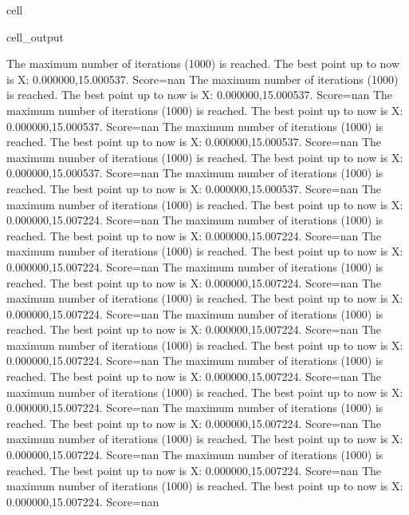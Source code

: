 \documentclass[letterpaper,10pt,english]{jupyterBook}
\begin{document}
\begin{sphinxuseclass}{cell}
\begin{sphinxVerbatimOutput}
\begin{sphinxuseclass}{cell_output}
\begin{sphinxVerbatim}[commandchars=\\\{\}]
The maximum number of iterations (1000) is reached. The best point up to now is X: \PYGZob{}0.000000,15.000537\PYGZcb{}. Score=\PYGZhy{}nan
The maximum number of iterations (1000) is reached. The best point up to now is X: \PYGZob{}0.000000,15.000537\PYGZcb{}. Score=\PYGZhy{}nan
The maximum number of iterations (1000) is reached. The best point up to now is X: \PYGZob{}0.000000,15.000537\PYGZcb{}. Score=\PYGZhy{}nan
The maximum number of iterations (1000) is reached. The best point up to now is X: \PYGZob{}0.000000,15.000537\PYGZcb{}. Score=\PYGZhy{}nan
The maximum number of iterations (1000) is reached. The best point up to now is X: \PYGZob{}0.000000,15.000537\PYGZcb{}. Score=\PYGZhy{}nan
The maximum number of iterations (1000) is reached. The best point up to now is X: \PYGZob{}0.000000,15.000537\PYGZcb{}. Score=\PYGZhy{}nan
The maximum number of iterations (1000) is reached. The best point up to now is X: \PYGZob{}0.000000,15.007224\PYGZcb{}. Score=\PYGZhy{}nan
The maximum number of iterations (1000) is reached. The best point up to now is X: \PYGZob{}0.000000,15.007224\PYGZcb{}. Score=\PYGZhy{}nan
The maximum number of iterations (1000) is reached. The best point up to now is X: \PYGZob{}0.000000,15.007224\PYGZcb{}. Score=\PYGZhy{}nan
The maximum number of iterations (1000) is reached. The best point up to now is X: \PYGZob{}0.000000,15.007224\PYGZcb{}. Score=\PYGZhy{}nan
The maximum number of iterations (1000) is reached. The best point up to now is X: \PYGZob{}0.000000,15.007224\PYGZcb{}. Score=\PYGZhy{}nan
The maximum number of iterations (1000) is reached. The best point up to now is X: \PYGZob{}0.000000,15.007224\PYGZcb{}. Score=\PYGZhy{}nan
The maximum number of iterations (1000) is reached. The best point up to now is X: \PYGZob{}0.000000,15.007224\PYGZcb{}. Score=\PYGZhy{}nan
The maximum number of iterations (1000) is reached. The best point up to now is X: \PYGZob{}0.000000,15.007224\PYGZcb{}. Score=\PYGZhy{}nan
The maximum number of iterations (1000) is reached. The best point up to now is X: \PYGZob{}0.000000,15.007224\PYGZcb{}. Score=\PYGZhy{}nan
The maximum number of iterations (1000) is reached. The best point up to now is X: \PYGZob{}0.000000,15.007224\PYGZcb{}. Score=\PYGZhy{}nan
The maximum number of iterations (1000) is reached. The best point up to now is X: \PYGZob{}0.000000,15.007224\PYGZcb{}. Score=\PYGZhy{}nan
The maximum number of iterations (1000) is reached. The best point up to now is X: \PYGZob{}0.000000,15.007224\PYGZcb{}. Score=\PYGZhy{}nan
The maximum number of iterations (1000) is reached. The best point up to now is X: \PYGZob{}0.000000,15.007224\PYGZcb{}. Score=\PYGZhy{}nan

\end{sphinxVerbatim}
\end{sphinxuseclass}
\end{sphinxVerbatimOutput}
\end{sphinxuseclass}
\end{document}
